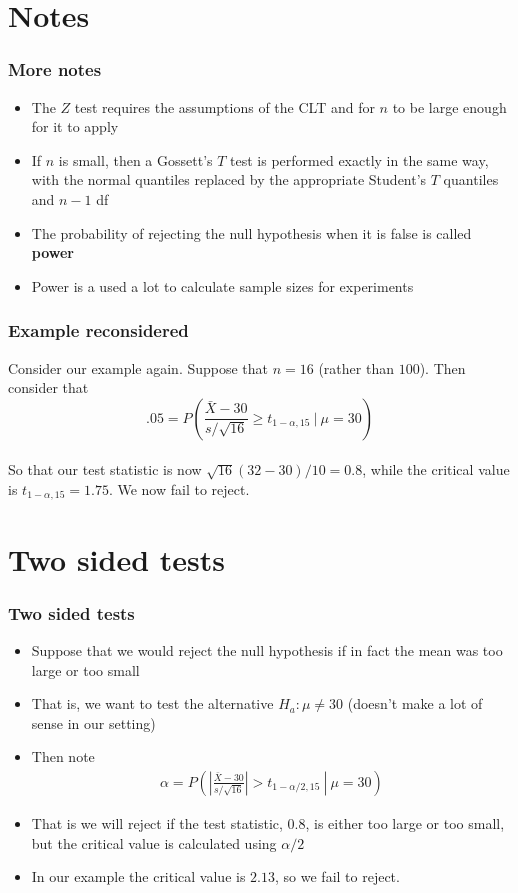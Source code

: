 \documentclass[aspectratio=169]{beamer}
\begin{document}
\section{Notes}
\begin{frame}\frametitle{More notes}
\begin{itemize}
\item The $Z$ test requires the assumptions of the CLT and for $n$ to be large enough
  for it to apply
\item If $n$ is small, then a Gossett's $T$ test is performed exactly in the same way,
  with the normal quantiles replaced by the appropriate Student's $T$ quantiles and
  $n-1$ df
\item The probability of rejecting the null hypothesis when it is false is called {\bf power}
\item Power is a used a lot to calculate sample sizes for experiments
\end{itemize}
\end{frame} 


\begin{frame}\frametitle{Example reconsidered}
Consider our example again. Suppose that $n= 16$ (rather than
$100$). Then consider that \\
$$
.05 = P\left(\frac{\bar X - 30}{s / \sqrt{16}} \geq t_{1-\alpha, 15} ~|~ \mu = 30 \right)
$$ \ \\
So that our test statistic is now $\sqrt{16}(32 - 30) / 10 = 0.8 $, while the critical
value is $t_{1-\alpha, 15} = 1.75$. We now fail to reject.
\end{frame}

\section{Two sided tests}
\begin{frame}\frametitle{Two sided tests}
\begin{itemize}
\item Suppose that we would reject the null hypothesis if in fact the 
  mean was too large or too small
\item That is, we want to test the alternative $H_a : \mu \neq 30$
  (doesn't make a lot of sense in our setting)
\item Then note
  \begin{eqnarray*}
\alpha = P\left(\left. \left|\frac{\bar X - 30}{s /\sqrt{16}}\right| > t_{1-\alpha/2,15} ~\right|~ \mu = 30\right)
  \end{eqnarray*}
\item That is we will reject if the test statistic, $0.8$, is either
  too large or too small, but the critical value is calculated using
  $\alpha / 2$
\item In our example the critical value is $2.13$, so we fail to reject.
\end{itemize}
\end{frame}
\end{document}
